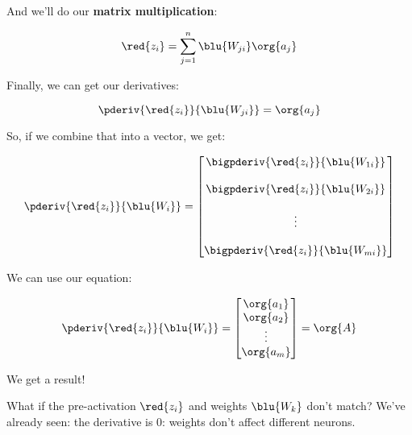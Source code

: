         And we'll do our \textbf{matrix multiplication}:
        
        \begin{equation}
            \red{z_i} 
            =
            \sum_{j=1}^n
            \blu{W_{ji} }\org{a_j}
        \end{equation}
        
        Finally, we can get our derivatives:
        
        \begin{equation}
            \pderiv{ \red{z_i} }{  \blu{W_{ji} }} = \org{a_j}
        \end{equation}
        
        So, if we combine that into a vector, we get:
        
        \begin{equation}
            \pderiv{ \red{z_i} }{  \blu{W_{i} }} =
            \begin{bmatrix}
                \bigpderiv{ \red{z_i} }{  \blu{W_{1i} }}
                \\\\
                \bigpderiv{ \red{z_i} }{  \blu{W_{2i} }}
                \\\\
                \vdots
                \\\\
                \bigpderiv{ \red{z_i} }{  \blu{W_{mi} }}
            \end{bmatrix}
        \end{equation}
        
        We can use our equation:
        
        \begin{equation}
            \pderiv{ \red{z_i} }{  \blu{W_{i}} } =
            \begin{bmatrix}
                \org{a_1}
                \\
                \org{a_2}
                \\
                \vdots
                \\
                \org{a_m}
            \end{bmatrix}
            =
            \org{A}
        \end{equation}
        
        We get a result!
        
        \subsecdiv
        
        What if the pre-activation $\red{z_i}$ and weights $\blu{W_{k}}$ don't match? We've already seen: the derivative is 0: weights don't affect different neurons.
        
